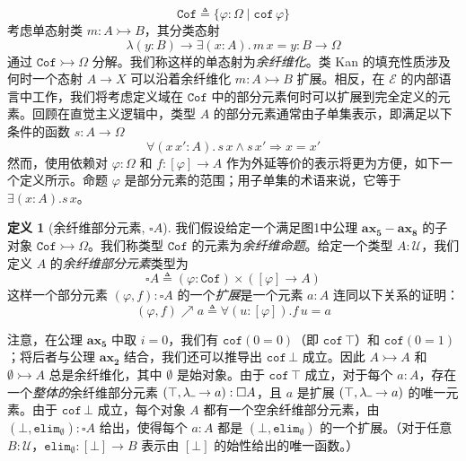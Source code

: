 \documentclass{ctexart}
\theoremstyle{plain}
\theoremstyle{definition}
\newtheorem{definition}[theorem]{定义}
\theoremstyle{definition}
\theoremstyle{definition}
\theoremstyle{definition}
\newcommand{\ax}[1]{\mathbf{ax_{#1}}}
\newcommand{\ul}{{\rule[0ex]{0.4em}{0.4pt}}} %
\numberwithin{equation}{section}
\begin{document}
\begin{equation}\mathtt{Cof} \triangleq \{ \varphi : \Omega \mid \mathtt{cof}\, \varphi \}\end{equation}
考虑单态射类 $m : A \rightarrowtail B$，其分类态射
\[\lambda(y : B) \to \exists(x : A). \, m\, x = y : B \to \Omega\]
通过 $\mathtt{Cof} \rightarrowtail \Omega$ 分解。我们称这样的单态射为\textit{余纤维化}。类 Kan 的填充性质涉及何时一个态射 $A \to X$ 可以沿着余纤维化 $m : A \rightarrowtail B$ 扩展。相反，在 $\mathcal{E}$ 的内部语言中工作，我们将考虑定义域在 $\mathtt{Cof}$ 中的部分元素何时可以扩展到完全定义的元素。回顾在直觉主义逻辑中，类型 $A$ 的部分元素通常由子单集表示，即满足以下条件的函数 $s : A \to \Omega$
\[\forall(x \, x' : A). \, s\, x \land s\, x' \Rightarrow x = x'\]
然而，使用依赖对 $\varphi : \Omega$ 和 $f : [\varphi] \to A$ 作为外延等价的表示将更为方便，如下一个定义所示。命题 $\varphi$ 是部分元素的范围；用子单集的术语来说，它等于 $\exists(x : A) . s\, x$。

\begin{definition}[余纤维部分元素, $\square A$]
  我们假设给定一个满足图1中公理 $\ax{5}-\ax{8}$ 的子对象 $\mathtt{Cof} \rightarrowtail \Omega$。我们称类型 $\mathtt{Cof}$ 的元素为\textit{余纤维命题}。给定一个类型 $A : \mathcal{U}$，我们定义 $A$ 的\textit{余纤维部分元素}类型为
\begin{equation}\square A \triangleq (\varphi : \mathtt{Cof}) \times ([\varphi] \to A)\end{equation}
这样一个部分元素 $(\varphi, f) : \square A$ 的一个\textit{扩展}是一个元素 $a : A$ 连同以下关系的证明：
\begin{equation}(\varphi, f) \nearrow a \triangleq \forall(u : [\varphi]) . f\, u = a\end{equation}
\end{definition}
注意，在公理 $\ax{5}$ 中取 $i = 0$，我们有 $\mathtt{cof}(0 = 0)$（即 $\mathtt{cof}\, \top$）和 $\mathtt{cof}(0 = 1)$；将后者与公理 $\ax{2}$ 结合，我们还可以推导出 $\mathtt{cof}\, \bot$ 成立。因此 $A \rightarrowtail A$ 和 $\emptyset \rightarrowtail A$ 总是余纤维化，其中 $\emptyset$ 是始对象。由于 $\mathtt{cof}\, \top$ 成立，对于每个 $a : A$，存在一个\textit{整体的}余纤维部分元素 $(\top, \lambda\ul \to a) : \square A$，且 $a$ 是扩展 $(\top, \lambda\ul \to a)$ 的唯一元素。由于 $\mathtt{cof}\, \bot$ 成立，每个对象 $A$ 都有一个空余纤维部分元素，由 $(\bot, \mathtt{elim}_\emptyset) : \square A$ 给出，使得每个 $a : A$ 都是 $(\bot, \mathtt{elim}_\emptyset)$ 的一个扩展。（对于任意 $B : \mathcal{U}$，$\mathtt{elim}_\emptyset : [\bot] \to B$ 表示由 $[\bot]$ 的始性给出的唯一函数。）
\end{document}
